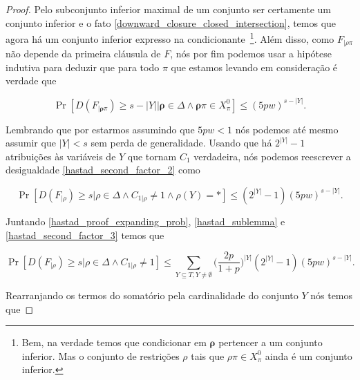 \begin{proof}
Pelo subconjunto inferior maximal de um conjunto ser certamente um conjunto inferior e o fato \ref{downward_closure_closed_intersection}, temos que agora há um conjunto inferior expresso na condicionante~\footnote{Bem, na verdade temos que condicionar em $\boldsymbol{\rho}$ pertencer a um conjunto inferior. Mas o conjunto de restrições $\rho$ tais que $\rho\pi \in X_{\pi}^{0}$ ainda é um conjunto inferior.}. Além disso, como $F_{\lvert \rho\pi}$ não depende da primeira cláusula de $F$, nós por fim podemos usar a hipótese indutiva para deduzir que para todo $\pi$ que estamos levando em consideração é verdade que

\begin{equation} \label{induction_hypothesis_second_factor}
	\Pr[D(F_{\lvert \boldsymbol{\rho} \pi}) \geq s - \lvert Y \rvert \lvert \boldsymbol{\rho} \in \Delta \land \boldsymbol{\rho}\pi \in X_{\pi}^{0}] \leq (5pw)^{s - \lvert Y \rvert}.
\end{equation}

Lembrando que por estarmos assumindo que $5pw < 1$ nós podemos até mesmo assumir que $\lvert Y \rvert < s$ sem perda de generalidade. Usando que há $2^{\lvert Y \rvert} - 1$ atribuições às variáveis de $Y$ que tornam $C_{1}$ verdadeira, nós podemos reescrever a desigualdade \ref{hastad_second_factor_2} como

\begin{equation} \label{hastad_second_factor_3}
	 \Pr[D(F_{\lvert \rho}) \geq s \lvert \rho \in \Delta \land C_{1 \lvert \rho} \neq 1 \land \rho(Y) = *] \leq (2^{\lvert Y \rvert} - 1)(5pw)^{s - \lvert Y \rvert}.
\end{equation}

Juntando \ref{hastad_proof_expanding_prob}, \ref{hastad_sublemma}  e \ref{hastad_second_factor_3} temos que

\begin{equation*}
	\Pr[D(F_{\lvert \rho}) \geq s \lvert \rho \in \Delta \land C_{1 \lvert \rho} \neq 1] \leq \sum_{Y \subseteq T, Y \neq \emptyset} \Big( \frac{2p}{1 + p} \Big)^{\lvert Y \rvert}(2^{\lvert Y \rvert} - 1)(5pw)^{s - \lvert Y \rvert}.
\end{equation*}

Rearranjando os termos do somatório pela cardinalidade do conjunto $Y$ nós temos que


\end{proof}
